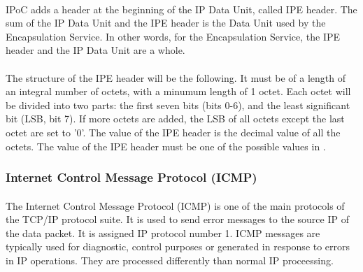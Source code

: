\paragraph{}IPoC adds a header at the beginning of the IP Data Unit, called IPE header. The sum of the IP Data Unit and the IPE header is the Data Unit used by the Encapsulation Service. In other words, for the Encapsulation Service, the IPE header and the IP Data Unit are a whole.
\paragraph{}The structure of the IPE header will be the following. It must be of a length of an integral number of octets, with a minumum length of 1 octet. Each octet will be divided into two parts: the first seven bits (bits 0-6), and the least significant bit (LSB, bit 7). If more octets are added, the LSB of all octets except the last octet are set to '0'. The value of the IPE header is the decimal value of all the octets. The value of the IPE header must be one of the possible values in \cite{SANAIPE}.

\subsubsection*{Internet Control Message Protocol (ICMP)\cite{ICMP}}
\paragraph{}The Internet Control Message Protocol (ICMP) is one of the main protocols of the TCP/IP protocol suite. It is used to send error messages to the source IP of the data packet. It is assigned IP protocol number 1. ICMP messages are typically used for diagnostic, control purposes or generated in response to errors in IP operations. They are processed differently than normal IP proceessing.

